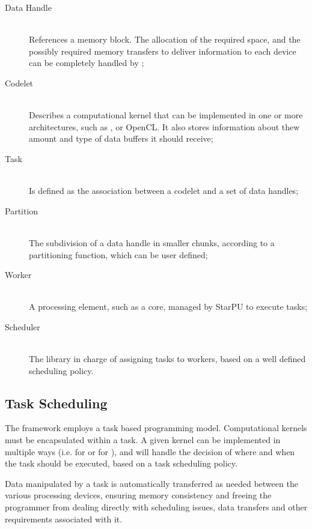 \documentclass[main.tex]{subfiles}
\begin{document}
\begin{description}
  \item[Data Handle] \hfill \\
    References a memory block. The allocation of the required space, and the possibly required memory transfers to deliver information to each device can be completely handled by \starpu;

  \item[Codelet] \hfill \\
    Describes a computational kernel that can be implemented in one or more architectures, such as \cpus, \cuda or \acs{OpenCL}. It also stores information about thew amount and type of data buffers it should receive;

  \item[Task] \hfill \\
    Is defined as the association between a codelet and a set of data handles;

  \item[Partition] \hfill \\
    The subdivision of a data handle in smaller chunks, according to a partitioning function, which can be user defined;

  \item[Worker] \hfill \\
    A processing element, such as a \cpu core, managed by StarPU to execute tasks;

  \item[Scheduler] \hfill \\
    The library in charge of assigning tasks to workers, based on a well defined scheduling policy.

\end{description}

\subsection{Task Scheduling}

The framework employs a task based programming model. Computational kernels must be encapsulated within a task. A given kernel can be implemented in multiple ways (i.e. for \cpus or for \cuda), and \starpu will handle the decision of where and when the task should be executed, based on a task scheduling policy.

Data manipulated by a task is automatically transferred as needed between the various processing devices, ensuring memory consistency and freeing the programmer from dealing directly with scheduling issues, data transfers and other requirements associated with it.
\end{document}
